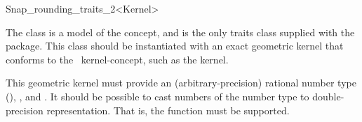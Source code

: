 
\ccRefPageBegin


\begin {ccRefClass} {Snap_rounding_traits_2<Kernel>}
    

The class  is a model of the
 concept, and is the only traits class supplied
with the package.
This class should be instantiated with an exact geometric kernel that conforms
to the \cgal\ kernel-concept, such as the
 kernel.

This geometric kernel must provide an (arbitrary-precision) rational number type
(), ,  and .
It should be possible to cast numbers of the number type  to 
double-precision representation. That is, the function 
 must be supported.


 
\ccIsModel
    \\
 
\end{ccRefClass} %
\ccRefPageEnd
